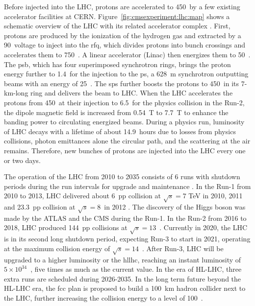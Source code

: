 Before injected into the LHC, protons are accelerated to 450~\GeV by a few existing accelerator facilities at CERN. Figure~\ref{fig:cmsexperiment:lhc:map} shows a schematic overview of the LHC with its related accelerator complex  \cite{exhep:lhcInject:Benedikt:2004wm}. First, protons are produced by the ionization of the hydrogen gas and extracted by a 90~\keV voltage to inject into the \acrfull{rfq}, which divides protons into bunch crossings and accelerates them to 750~\keV. A linear accelerator (Linac) then energizes them to 50~\MeV. The \acrfull{psb}, which has four superimposed synchrotron rings, brings the proton energy further to 1.4~\GeV for the injection to the \acrfull{ps}, a 628~m synchrotron outputting beams with an energy of 25~\GeV. The \acrfull{sps} further boosts the protons to 450~\GeV in its 7-km-long ring and delivers the beam to LHC. When the LHC accelerates the protons from 450~\GeV at their injection to 6.5~\TeV for the physics collision in the Run-2, the dipole magnetic field is increased from 0.54~T to 7.7~T to enhance the banding power to circulating energized beams. During a physics run, luminosity of LHC decays with a lifetime of about 14.9~hours \cite{exhep:lhc:Evans:2008zzb} due to losses from physics collisions, photon emittances alone the circular path, and the scattering at the air remains. Therefore, new bunches of protons are injected into the LHC every one or two days.



The operation of the LHC from 2010 to 2035 consists of 6 runs with shutdown periods during the run intervals for upgrade and maintenance . In the Run-1 from 2010 to 2013, LHC delivered about 6~\fbinv pp collision at $\sqrt{s}=7$ TeV in 2010, 2011 and 23.3~\fbinv pp collision at $\sqrt{s}=8$~\TeV in 2012 \cite{cms:publicLumiInfo}. The discovery of the Higgs boson was made by the ATLAS \cite{exhep:atlasHiggsDisc:Aad:2012tfa} and the CMS \cite{exhep:cmsHiggsDisc:Chatrchyan:2012ufa} during the Run-1. In the Run-2 from 2016 to 2018, LHC produced 144~\fbinv pp collisions at $\sqrt{s}=13$~\TeV \cite{cms:publicLumiInfo}. Currently in 2020, the LHC is in its second long shutdown period, expecting Run-3 to start in 2021, operating at the maximum collision energy of $\sqrt{s}=14$~\TeV. After Run-3, LHC will be upgraded to a higher luminosity or the \acrfull{hllhc}, reaching an instant luminosity of $5 \times 10^{34}$~\percms, five times as much as the current value. In the era of HL-LHC, three extra runs are scheduled during 2026-2035. In the long term future beyond the HL-LHC era, the \acrfull{fcc} \cite{exhep:fcc:Benedikt:2715354} plan is proposed to build a 100~km hadron collider next to the LHC, further increasing the collision energy to a level of 100~\TeV.